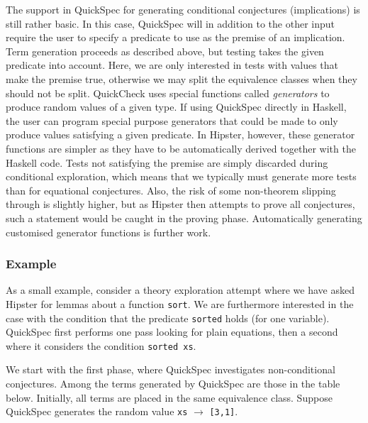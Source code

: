 The support in QuickSpec for generating conditional conjectures (implications) is still rather basic. In this case, QuickSpec will in addition to the other input require the user to specify a predicate to use as the premise of an implication. Term generation proceeds as described above, but testing takes the given predicate into account. Here, we are only interested in tests with values that make the premise true, otherwise we may split the equivalence classes when they should not be split. QuickCheck uses special functions called \emph{generators} to produce random values of a given type. If using QuickSpec directly in Haskell, the user can program special purpose generators that could be made to only produce values satisfying a given predicate. In Hipster, however, these generator functions are simpler as they have to be automatically derived together with the Haskell code. Tests not satisfying the premise are simply discarded during conditional exploration, which means that we typically must generate more tests than for equational conjectures. Also, the risk of some non-theorem slipping through is slightly higher, but as Hipster then attempts to prove all conjectures, such a statement would be caught in the proving phase. Automatically generating customised generator functions is further work. 

\subsubsection*{Example}
As a small example, consider a theory exploration attempt where we have asked Hipster for lemmas about a function \texttt{sort}. We are furthermore interested in the case with the condition that the predicate \texttt{sorted} holds (for one variable). %
QuickSpec first performs one pass looking for plain equations, then a second where it considers the condition \texttt{sorted xs}. 

We start with the first phase, where QuickSpec investigates non-conditional conjectures. Among the terms generated by QuickSpec are those in the table below. Initially, all terms are placed in the same equivalence class. Suppose QuickSpec generates the random value \texttt{xs} $\rightarrow$ \texttt{[3,1]}.     

